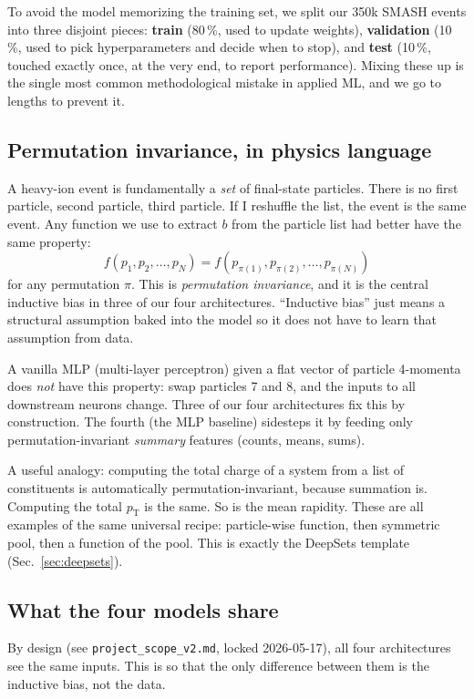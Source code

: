 \documentclass[11pt]{article}
\newcommand{\pT}{\ensuremath{p_{\text{T}}}}
\begin{document}
To avoid the model memorizing the training set, we split our 350k
SMASH events into three disjoint pieces: \textbf{train} (80\,\%, used
to update weights), \textbf{validation} (10\,\%, used to pick
hyperparameters and decide when to stop), and \textbf{test} (10\,\%,
touched exactly once, at the very end, to report performance). Mixing
these up is the single most common methodological mistake in applied
ML, and we go to lengths to prevent it.

\subsection{Permutation invariance, in physics language}

A heavy-ion event is fundamentally a \emph{set} of final-state
particles. There is no first particle, second particle, third
particle. If I reshuffle the list, the event is the same event. Any
function we use to extract $b$ from the particle list had better have
the same property:
\[
   f(p_1, p_2, \dots, p_N) = f(p_{\pi(1)}, p_{\pi(2)}, \dots, p_{\pi(N)})
\]
for any permutation $\pi$. This is \emph{permutation invariance}, and
it is the central inductive bias in three of our four architectures.
``Inductive bias'' just means a structural assumption baked into the
model so it does not have to learn that assumption from data.

A vanilla MLP (multi-layer perceptron) given a flat vector of particle
4-momenta does \emph{not} have this property: swap particles 7 and 8,
and the inputs to all downstream neurons change. Three of our four
architectures fix this by construction. The fourth (the MLP baseline)
sidesteps it by feeding only permutation-invariant \emph{summary}
features (counts, means, sums).

A useful analogy: computing the total charge of a system from a list
of constituents is automatically permutation-invariant, because
summation is. Computing the total $\pT$ is the same. So is the mean
rapidity. These are all examples of the same universal recipe:
particle-wise function, then symmetric pool, then a function of the
pool. This is exactly the DeepSets template (Sec.~\ref{sec:deepsets}).

\subsection{What the four models share}

By design (see \texttt{project\_scope\_v2.md}, locked 2026-05-17), all
four architectures see the same inputs. This is so that the only
difference between them is the inductive bias, not the data.
\end{document}
